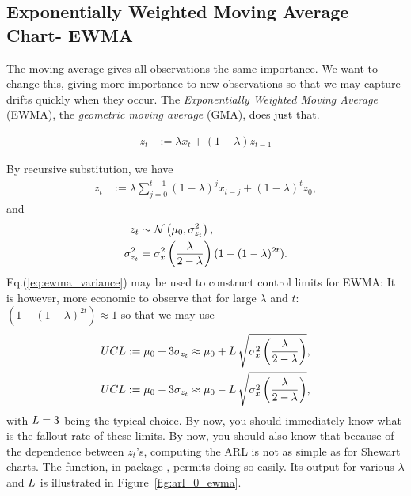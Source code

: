 \subsection{Exponentially Weighted Moving Average Chart- EWMA}
The moving average gives all observations the same importance. 
We want to change this, giving more importance to new observations so that we may capture drifts quickly when they occur. 
The \emph{Exponentially Weighted Moving Average} (EWMA), \aka the \emph{geometric moving average} (GMA), does just that. 
\begin{definition}
\begin{align}
	z_t &:= \lambda x_t + (1-\lambda) z_{t-1}
\end{align}
\end{definition}
By recursive substitution, we have 
\begin{align}
	z_t &:= \lambda \sum_{j=0}^{t-1} (1-\lambda)^j x_{t-j} + (1-\lambda)^t z_0,
\end{align}
and 
\begin{align}
\label{eq:ewma_variance}
	z_t &\sim \mathcal{N}\left(\mu_0,	\sigma^2_{z_t} \right), \\
	\sigma^2_{z_t} &= \sigma^2_x \left( \frac{\lambda}{2-\lambda} \right)(1-(1-\lambda)^{2t}).
\end{align}
Eq.(\ref{eq:ewma_variance}) may be used to construct control limits for EWMA:
It is however, more economic to observe that for large $\lambda$ and $t$: $(1-(1-\lambda)^{2t}) \approx 1$ so that we may use 
\begin{align}
\begin{split}
\label{eq:ewma_variance_approximate}
	UCL &:= \mu_0 + 3 \sigma_{z_t} \approx \mu_0 + L \, \sqrt{\sigma^2_x\left( \frac{\lambda}{2-\lambda} \right)},  \\
	UCL &:= \mu_0 - 3 \sigma_{z_t} \approx \mu_0 - L \, \sqrt{\sigma^2_x\left( \frac{\lambda}{2-\lambda} \right)},
\end{split}
\end{align}
with $L=3$ being the typical choice.
By now, you should immediately know what is the fallout rate of these limits.
By now, you should also know that because of the dependence between $z_t$'s, computing the ARL is not as simple as for Shewart charts. The  \R function, in package , permits doing so easily. 
Its output for various $\lambda$ and $L$ is illustrated in Figure~\ref{fig:arl_0_ewma}.

